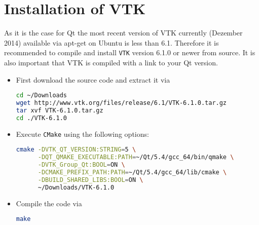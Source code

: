 \section{Installation of VTK}
As it is the case for Qt the most recent version of VTK currently (Dezember 2014) available via apt-get on Ubuntu is less than 6.1. Therefore it is recommended to compile and install \texttt{VTK} version 6.1.0 or newer from source. It is also important that VTK is compiled with a link to your Qt version. 
\begin{itemize}
\item First download the source code and extract it via
\begin{lstlisting}[language=bash, numbers=none]
cd ~/Downloads
wget http://www.vtk.org/files/release/6.1/VTK-6.1.0.tar.gz
tar xvf VTK-6.1.0.tar.gz
cd ./VTK-6.1.0
\end{lstlisting}
\item Execute \texttt{CMake} using the following options:
\begin{lstlisting}[language=bash, numbers=none]
cmake -DVTK_QT_VERSION:STRING=5 \
      -DQT_QMAKE_EXECUTABLE:PATH=~/Qt/5.4/gcc_64/bin/qmake \
      -DVTK_Group_Qt:BOOL=ON \
      -DCMAKE_PREFIX_PATH:PATH=~/Qt/5.4/gcc_64/lib/cmake \
      -DBUILD_SHARED_LIBS:BOOL=ON \
      ~/Downloads/VTK-6.1.0
\end{lstlisting}
\item Compile the code via
\begin{lstlisting}[language=bash, numbers=none]
make
\end{lstlisting}
\end{itemize}


